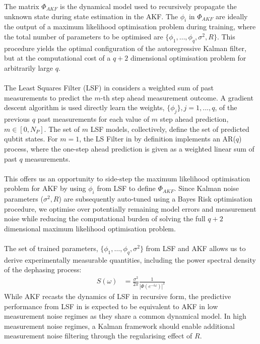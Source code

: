 The matrix $\Phi_{AKF}$ is the dynamical model used to recursively propagate the unknown state during state estimation in the AKF. The ${\phi_i}$ in $\Phi_{AKF}$ are ideally the output of a maximum likelihood optimisation problem during training, where the total number of parameters to be optimised are $\{\phi_1, \hdots, \phi_q, \sigma^2, R \}$. This procedure yields the optimal configuration of the autoregressive Kalman filter, but at the computational cost of a $q+2$ dimensional optimisation problem for arbitrarily large $q$.
\\
\\
The Least Squares Filter (LSF) in \cite{mavadia2017} considers a weighted sum of past measurements to predict the $m$-th step ahead measurement outcome. A gradient descent algorithm is used directly learn the weights, $\{\phi_j\}, j = 1, ... , q $, of the previous $q$ past measurements for each value of $m$ step ahead prediction, $m \in [0, N_P]$. The set of $m$ LSF models, collectively, define the set of predicted qubtit states. For $m=1$, the LS Filter in \cite{mavadia2017} by definition implements an AR($q$) process, where the one-step ahead prediction is given as a weighted linear sum of past $q$ measurements. 
\\
\\
This offers us an opportunity to side-step the maximum likelihood optimisation problem for AKF by using ${\phi_i}$ from LSF to define $\Phi_{AKF}$. Since Kalman noise parameters ($\sigma^2, R$) are subsequently auto-tuned using a Bayes Risk optimisation procedure, we optimise over potentially remaining model errors and measurement noise while reducing the computational burden of solving the full $q+2$ dimensional maximum likelihood optimisation problem. 
\\
\\
The set of trained parameters, $\{\phi_1, \hdots, \phi_q, \sigma^2\}$ from LSF and AKF allows us to derive experimentally measurable quantities, including the power spectral density of the dephasing process:
\begin{align}
S(\omega) & = \frac{\sigma^2}{2 \pi }\frac{1}{|\Phi(e^{-i\omega})|^2} \label{eqn:sec:ap_ssp_ar_spectden} 
\end{align}
While AKF recasts the dynamics of LSF in recursive form, the predictive performance from LSF in \cite{mavadia2017} is expected to be equivalent to AKF in low measurement noise regimes as they share a common dynamical model. In high measurement noise regimes, a Kalman framework should enable additional measurement noise filtering through the regularising effect of $R$. 

